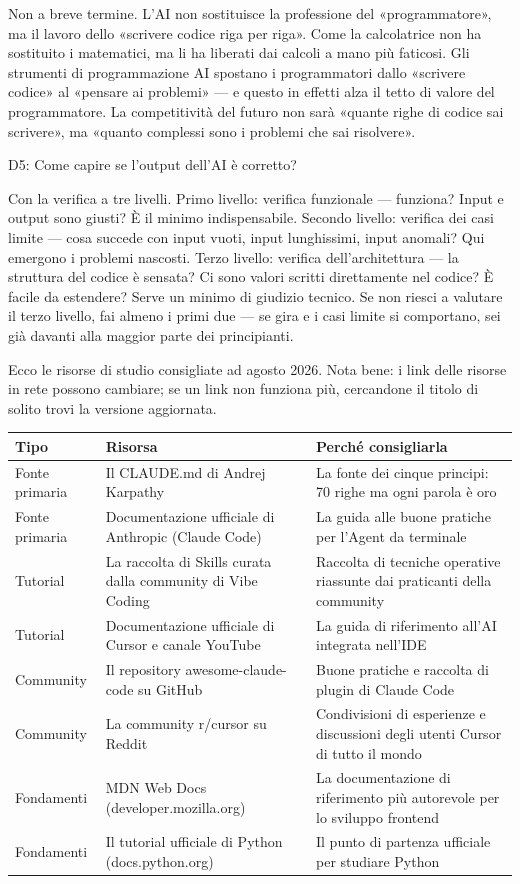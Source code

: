 Non a breve termine. L'AI non sostituisce la professione del «programmatore», ma il lavoro dello «scrivere codice riga per riga». Come la calcolatrice non ha sostituito i matematici, ma li ha liberati dai calcoli a mano più faticosi. Gli strumenti di programmazione AI spostano i programmatori dallo «scrivere codice» al «pensare ai problemi» — e questo in effetti alza il tetto di valore del programmatore. La competitività del futuro non sarà «quante righe di codice sai scrivere», ma «quanto complessi sono i problemi che sai risolvere».

D5: Come capire se l'output dell'AI è corretto?

Con la verifica a tre livelli. Primo livello: verifica funzionale — funziona? Input e output sono giusti? È il minimo indispensabile. Secondo livello: verifica dei casi limite — cosa succede con input vuoti, input lunghissimi, input anomali? Qui emergono i problemi nascosti. Terzo livello: verifica dell'architettura — la struttura del codice è sensata? Ci sono valori scritti direttamente nel codice? È facile da estendere? Serve un minimo di giudizio tecnico. Se non riesci a valutare il terzo livello, fai almeno i primi due — se gira e i casi limite si comportano, sei già davanti alla maggior parte dei principianti.


Ecco le risorse di studio consigliate ad agosto 2026. Nota bene: i link delle risorse in rete possono cambiare; se un link non funziona più, cercandone il titolo di solito trovi la versione aggiornata.

\begin{center}
\begin{tabularx}{\linewidth}{|X|X|X|}
\hline
\textbf{Tipo} & \textbf{Risorsa} & \textbf{Perché consigliarla} \tabularnewline
\hline
Fonte primaria & Il CLAUDE.md di Andrej Karpathy & La fonte dei cinque principi: 70 righe ma ogni parola è oro \tabularnewline
Fonte primaria & Documentazione ufficiale di Anthropic (Claude Code) & La guida alle buone pratiche per l'Agent da terminale \tabularnewline
Tutorial & La raccolta di Skills curata dalla community di Vibe Coding & Raccolta di tecniche operative riassunte dai praticanti della community \tabularnewline
Tutorial & Documentazione ufficiale di Cursor e canale YouTube & La guida di riferimento all'AI integrata nell'IDE \tabularnewline
Community & Il repository awesome-claude-code su GitHub & Buone pratiche e raccolta di plugin di Claude Code \tabularnewline
Community & La community r/cursor su Reddit & Condivisioni di esperienze e discussioni degli utenti Cursor di tutto il mondo \tabularnewline
Fondamenti & MDN Web Docs (developer.mozilla.org) & La documentazione di riferimento più autorevole per lo sviluppo frontend \tabularnewline
Fondamenti & Il tutorial ufficiale di Python (docs.python.org) & Il punto di partenza ufficiale per studiare Python \tabularnewline
\hline
\end{tabularx}
\end{center}


